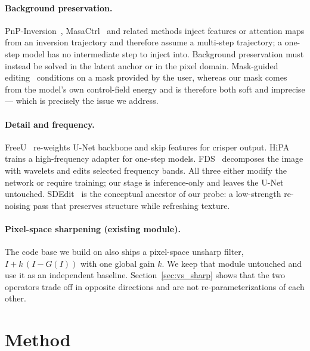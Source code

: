 \documentclass[10pt,twocolumn,letterpaper]{article}
\begin{document}
\paragraph{Background preservation.}
PnP-Inversion~\cite{pnpinversion}, MasaCtrl~\cite{masactrl} and related methods
inject features or attention maps from an inversion trajectory and therefore
assume a multi-step trajectory; a one-step model has no intermediate step to
inject into. Background preservation must instead be solved in the latent anchor
or in the pixel domain. Mask-guided editing~\cite{diffedit} conditions on a mask
provided by the user, whereas our mask comes from the model's own control-field
energy and is therefore both soft and imprecise --- which is precisely the issue
we address.

\paragraph{Detail and frequency.}
FreeU~\cite{freeu} re-weights U-Net backbone and skip features for crisper
output. HiPA~\cite{hipa} trains a high-frequency adapter for one-step models.
FDS~\cite{fds} decomposes the image with wavelets and edits selected frequency
bands. All three either modify the network or require training; our stage is
inference-only and leaves the U-Net untouched. SDEdit~\cite{sdedit} is the
conceptual ancestor of our probe: a low-strength re-noising pass that preserves
structure while refreshing texture.

\paragraph{Pixel-space sharpening (existing module).}
The code base we build on also ships a pixel-space unsharp filter,
$I + k\,(I-G(I))$ with one global gain $k$. We keep that module untouched and use
it as an independent baseline. Section~\ref{sec:vs_sharp} shows that the two
operators trade off in opposite directions and are not re-parameterizations of
each other.

\section{Method}
\label{sec:method}
\end{document}
